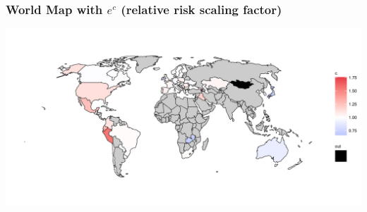 \documentclass[table,xcdraw,dvipsnames,handout]{beamer}
\begin{document}
\begin{frame}[fragile]\frametitle{World Map with $e^c$ (relative risk scaling factor)}
	\hspace{-2cm}
			\includegraphics[scale=0.8]{Figures/scale_factor_map}
\end{frame}
\end{document}
